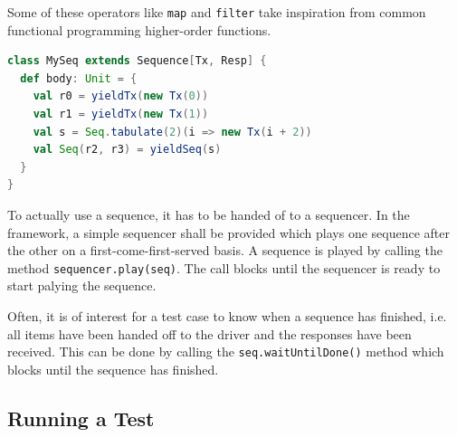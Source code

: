 \documentclass[11pt,a4paper]{report}
\newcommand{\ttt}{\texttt}
\newcommand{\todo}[1]{\textcolor{red}{TODO: #1}}
\begin{document}
Some of these operators like \ttt{map} and \ttt{filter} take inspiration from common functional programming higher-order functions.


\begin{listing}
\begin{lstlisting}[language=scala, captionpos=b, caption=Example of a sequence producing four items of type \ttt{Tx} with responses of type \ttt{Resp}.,label=lst:sequence]
class MySeq extends Sequence[Tx, Resp] {
  def body: Unit = {
    val r0 = yieldTx(new Tx(0))
    val r1 = yieldTx(new Tx(1))
    val s = Seq.tabulate(2)(i => new Tx(i + 2))
    val Seq(r2, r3) = yieldSeq(s)
  }
}
\end{lstlisting}
\end{listing}

To actually use a sequence, it has to be handed of to a sequencer. In the framework, a simple sequencer shall be provided which plays one sequence after the other on a first-come-first-served basis. A sequence is played by calling the method \ttt{sequencer.play(seq)}. The call blocks until the sequencer is ready to start palying the sequence.

Often, it is of interest for a test case to know when a sequence has finished, i.e. all items have been handed off to the driver and the responses have been received. This can be done by calling the \ttt{seq.waitUntilDone()} method which blocks until the sequence has finished.

\subsection{Running a Test} %
\end{document}
